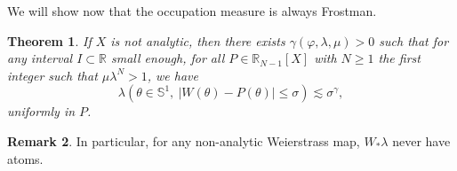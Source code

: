 \documentclass[11pt]{amsart}
\theoremstyle{plain}
\newtheorem{theorem}{Theorem}[section]
\theoremstyle{definition}
\newtheorem{remark}[theorem]{Remark}
\numberwithin{equation}{section}
\begin{document}
We will show now that the occupation measure is always Frostman.

\begin{theorem}\label{thm:c1+alpharegularity}
If $X$ is not analytic, then there exists $\gamma(\varphi,\lambda,\mu)>0$ such that for any  interval $I \subset \mathbb{R}$ small enough, for all $P \in \mathbb{R}_{N-1}[X]$ with $N \geq 1$ the first integer such that $\mu \lambda^N >1$, we have 
$$\lambda( \theta \in {\mathbb{S}^1}  , \ |W(\theta)-P(\theta)| \leq \sigma) \lesssim \sigma^\gamma ,$$
uniformly in $P$.
\end{theorem}

\begin{remark}
In particular, for any non-analytic Weierstrass map, $W_* \lambda$ never have atoms.
\end{remark}
\end{document}
